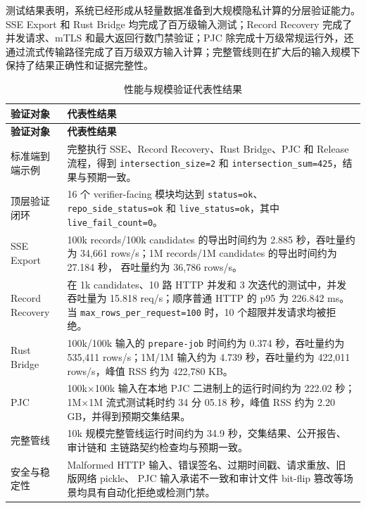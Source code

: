 \documentclass[UTF8,a4paper,12pt,oneside]{ctexrep}
\begin{document}
测试结果表明，系统已经形成从轻量数据准备到大规模隐私计算的分层验证能力。SSE Export 和 Rust Bridge 均完成了百万级输入测试；Record Recovery 完成了并发请求、mTLS 和最大返回行数门禁验证；PJC 除完成十万级常规运行外，还通过流式传输路径完成了百万级双方输入计算；完整管线则在扩大后的输入规模下保持了结果正确性和证据完整性。

\begin{longtable}{p{}p{}}
\caption{性能与规模验证代表性结果}
\label{tab:performance-scale-results}\\
\toprule
\textbf{验证对象} & \textbf{代表性结果} \\
\midrule
\endfirsthead
\toprule
\textbf{验证对象} & \textbf{代表性结果} \\
\midrule
\endhead
\bottomrule
\endfoot

标准端到端示例 &
完整执行 SSE、Record Recovery、Rust Bridge、PJC 和 Release 流程，得到
\texttt{intersection\_size=2} 和
\texttt{intersection\_sum=425}，结果与预期一致。 \\

顶层验证闭环 &
16 个 verifier-facing 模块均达到
\texttt{status=ok}、\texttt{repo\_side\_status=ok} 和
\texttt{live\_status=ok}，其中
\texttt{live\_fail\_count=0}。 \\

SSE Export &
100k records/100k candidates 的导出时间约为 2.885 秒，吞吐量约为
34,661 rows/s；1M records/1M candidates 的导出时间约为 27.184 秒，
吞吐量约为 36,786 rows/s。 \\

Record Recovery &
在 1k candidates、10 路 HTTP 并发和 3 次迭代的测试中，并发吞吐量为
15.818 req/s；顺序普通 HTTP 的 p95 为 226.842 ms。当
\texttt{max\_rows\_per\_request=100} 时，10 个超限并发请求均被拒绝。 \\

Rust Bridge &
100k/100k 输入的 \texttt{prepare-job} 时间约为 0.374 秒，吞吐量约为
535,411 rows/s；1M/1M 输入约为 4.739 秒，吞吐量约为
422,011 rows/s，峰值 RSS 约为 422,780 KB。 \\

PJC &
100k$\times$100k 输入在本地 PJC 二进制上的运行时间约为 222.02 秒；
1M$\times$1M 流式测试耗时约 34 分 05.18 秒，峰值 RSS 约为
2.20 GB，并得到预期交集结果。 \\

完整管线 &
10k 规模完整管线运行时间约为 34.9 秒，交集结果、公开报告、审计链和
主链路契约检查均与预期一致。 \\

安全与稳定性 &
Malformed HTTP 输入、错误签名、过期时间戳、请求重放、旧版网络 pickle、
PJC 输入承诺不一致和审计文件 bit-flip 篡改等场景均具有自动化拒绝或检测门禁。 \\

\end{longtable}
\end{document}
